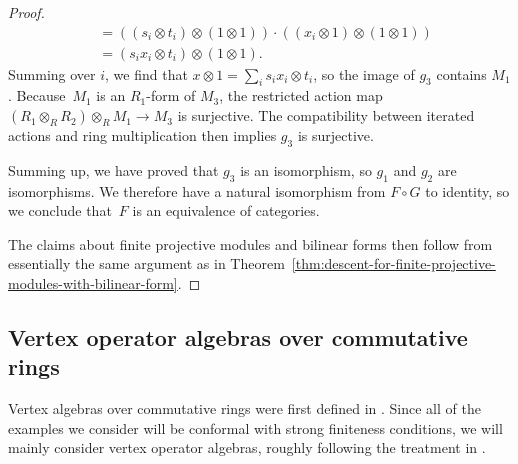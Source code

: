 \documentclass[11pt]{article}
\theoremstyle{definition}
\begin{document}
\begin{proof}
\begin{align*}
&= ((s_i \otimes t_i) \otimes (1 \otimes 1))\cdot ((x_i \otimes 1) \otimes (1 \otimes 1)) \\
&= (s_i x_i \otimes t_i) \otimes (1 \otimes 1).
\end{align*}
Summing over $i$, we find that $x \otimes 1 = \sum_i s_i x_i \otimes t_i$, so the image of $g_3$ contains $M_1$. Because~$M_1$ is an $R_1$-form of $M_3$, the restricted action map $(R_1 \otimes_{R} R_2) \otimes_{R} M_1 \to M_3$ is surjective. The compatibility between iterated actions and ring multiplication then implies $g_3$ is surjective.

Summing up, we have proved that $g_3$ is an isomorphism, so $g_1$ and $g_2$ are isomorphisms. We therefore have a natural isomorphism from $F \circ G$ to identity, so we conclude that~$F$ is an equivalence of categories.

The claims about finite projective modules and bilinear forms then follow from essentially the same argument as in Theorem~\ref{thm:descent-for-finite-projective-modules-with-bilinear-form}.
\end{proof}

\subsection{Vertex operator algebras over commutative rings}

Vertex algebras over commutative rings were first defined in \cite{B86}. Since all of the examples we consider will be conformal with strong finiteness conditions, we will mainly consider vertex operator algebras, roughly following the treatment in \cite{DR13}.
\end{document}
